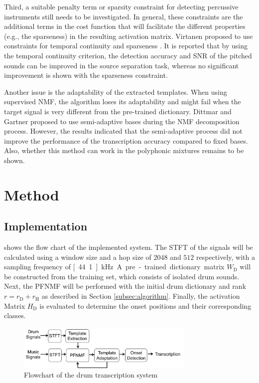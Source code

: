 \documentclass{article}
\begin{document}
Third, a suitable penalty term or sparsity constraint for detecting percussive instruments still needs to be investigated. In general, these constraints are the additional terms in the cost function that will facilitate the different properties (e.g., the sparseness) in the resulting activation matrix. Virtanen proposed to use constraints for temporal continuity and sparseness \cite{virtanen_ssnmf_2007}. It is reported that by using the temporal continuity criterion, the detection accuracy and SNR of the pitched sounds can be improved in the source separation task, whereas no significant improvement is shown with the sparseness constraint. 

Another issue is the adaptability of the extracted templates. When using supervised NMF, the algorithm loses its adaptability and might fail when the target signal is very different from the pre-trained dictionary. Dittmar and Gartner proposed to use semi-adaptive bases during the NMF decomposition process\cite{Dittmar2014}. However, the results indicated that the semi-adaptive process did not improve the performance of the transcription accuracy compared to fixed bases. Also, whether this method can work in the polyphonic mixtures remains to be shown. 

\section{Method}\label{sec:method}
\subsection{Implementation}\label{subsec:processing steps}

 shows the flow chart of the implemented system. The STFT of the signals will be calculated using a window size and a hop size of $2048$ and $512$ respectively, with a sampling frequency of \unit[44.1]{kHz}. 
A pre-trained dictionary matrix $W_\mathrm{D}$ will be constructed from the training set, which consists of isolated drum sounds. 
Next, the PFNMF will be performed with the initial drum dictionary and rank $r = r_\mathrm{D} + r_\mathrm{H}$ as described in Section \ref{subsec:algorithm}. Finally, the activation Matrix $H_\mathrm{D}$ is evaluated to determine the onset positions and their corresponding classes.  

\begin{figure}
 \centerline{%
 \includegraphics[width=8.5cm]{flowchart.png}}%
 \caption{Flowchart of the drum transcription system}
 \label{fig:flowchart}
\end{figure}
\end{document}
